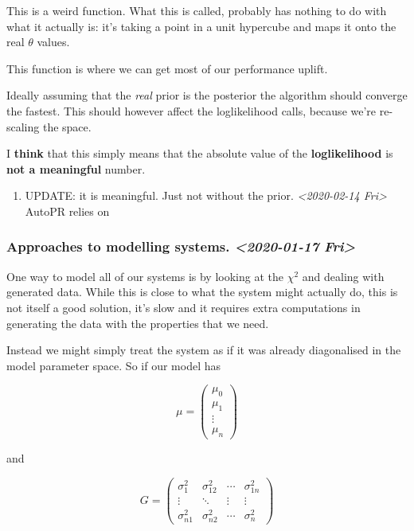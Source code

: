 \documentclass[11pt]{article}
\begin{document}
This is a weird function. What this is called, probably has
nothing to do with what it actually is: it's taking a point in
a unit hypercube and maps it onto the real \(\theta\) values.

This function is where we can get most of our performance
uplift.

Ideally assuming that the \emph{real} prior is the posterior the
algorithm should converge the fastest. This should however
affect the loglikelihood calls, because we're re-scaling the
space.

I \textbf{\textbf{think}} that this simply means that the absolute value of
the \textbf{\textbf{loglikelihood}} is \textbf{\textbf{not a meaningful}} number.

\begin{enumerate}
\item UPDATE: it is meaningful. Just not without the prior.  \textit{<2020-02-14 Fri>}
\label{sec:org13d7bd2}
AutoPR relies on
\end{enumerate}


\subsubsection{Approaches to modelling systems.  \textit{<2020-01-17 Fri>}}
\label{sec:orga849bf0}
One way to model all of our systems is by looking at the \(\chi^2\) and dealing with generated data. While this is close
to what the system might actually do, this is not itself a
good solution, it's slow and it requires extra computations in
generating the data with the properties that we need.

Instead we might simply treat the system as if it was already
diagonalised in the model parameter space. So if our model has

\begin{equation}
  \mu =
  \begin{pmatrix}
    \mu_{0}\\
    \mu_{1}\\
    \vdots\\
    \mu_{n}
  \end{pmatrix}
\end{equation}

and 

\begin{equation}
  G =
  \begin{pmatrix}
    \sigma_{1}^2 & \sigma_{12}^2 & \cdots & \sigma_{1n}^2\\
    \vdots & \ddots &  \vdots & \vdots \\
     \sigma_{n1}^2 & \sigma_{n2}^2 & \cdots & \sigma_{n}^2
  \end{pmatrix}
\end{equation}
\end{document}
